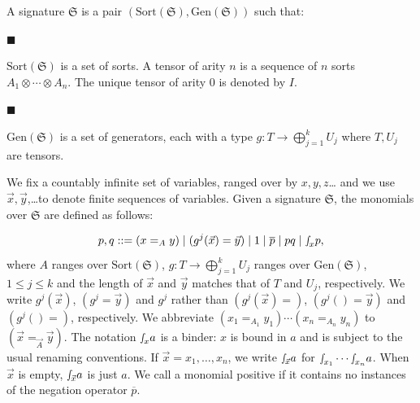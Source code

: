 A signature $\mathfrak{S}$ is a pair $(\mathrm{Sort}(\mathfrak{S}),\mathrm{Gen}(\mathfrak{S}))$ such that:\par
  
\par\noindent  $\blacksquare$ 
 
$\mathrm{Sort}(\mathfrak{S})$ is a set of sorts. A tensor of arity $n$ is a sequence of $n$ sorts $A_{1}\otimes\cdots\otimes A_{n}$. The unique tensor of arity $0$ is denoted by $I$.\par
 
 
 
\par\noindent  $\blacksquare$ 
 
$\mathrm{Gen}(\mathfrak{S})$ is a set of generators, each with a type $g:T\to\bigoplus_{j=1}^{k}U_{j}$ where $T,U_{j}$ are tensors.\par
 
 
  
 
 
 
We fix a countably infinite set of variables, ranged over by $x,y,z$… and we use $\vec{x},\vec{y}$,…to denote finite sequences of variables. Given a signature $\mathfrak{S}$, the monomials over $\mathfrak{S}$ are defined as follows:\par
    \[p,q::=(x=_{A}y)\mathrel{|}(g^{j}(\vec{x})=\vec{y})\mathrel{|}1\mathrel{|}%
\overline{p}\mathrel{|}pq\mathrel{|}{\smallint\!}_{x}p,\]    
where $A$ ranges over $\mathrm{Sort}(\mathfrak{S})$, $g:T\to\bigoplus_{j=1}^{k}U_{j}$ ranges over $\mathrm{Gen}(\mathfrak{S})$, $1\leq j\leq k$ and the length of $\vec{x}$ and $\vec{y}$ matches that of $T$ and $U_{j}$, respectively. We write $g^{j}(\vec{x})$, $(g^{j}=\vec{y})$ and $g^{j}$ rather than $(g^{j}(\vec{x})=)$, $(g^{j}()=\vec{y})$ and $(g^{j}()=)$, respectively. We abbreviate $(x_{1}=_{A_{1}}y_{1})\cdots(x_{n}=_{A_{n}}y_{n})$ to $(\vec{x}=_{\vec{A}}\vec{y})$. The notation ${\smallint\!}_{x}a$ is a binder: $x$ is bound in $a$ and is subject to the usual renaming conventions. If $\vec{x}=x_{1},\ldots,x_{n}$, we write ${\smallint\!}_{\vec{x}}a$ for ${\smallint\!}_{x_{1}}\cdots{\smallint\!}_{x_{n}}a$. When $\vec{x}$ is empty, ${\smallint\!}_{\vec{x}}a$ is just $a$. We call a monomial positive if it contains no instances of the negation operator $\overline{p}$.\par
 
